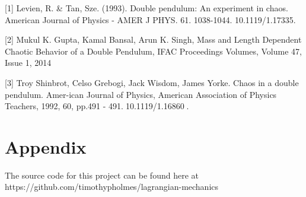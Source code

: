 \documentclass[runningheads]{llncs}
\begin{document}
\clearpage{}



\clearpage{}
%
%
%





[1] Levien, R. & Tan, Sze. (1993). Double pendulum: An experiment in chaos. American Journal of Physics - AMER J PHYS. 61. 1038-1044. 10.1119/1.17335. 

[2] Mukul K. Gupta, Kamal Bansal, Arun K. Singh,
Mass and Length Dependent Chaotic Behavior of a Double Pendulum,
IFAC Proceedings Volumes, Volume 47, Issue 1, 2014

[3] Troy Shinbrot, Celso Grebogi, Jack Wisdom, James Yorke.  Chaos in a double pendulum.  Amer-ican  Journal  of  Physics,  American  Association  of  Physics  Teachers,  1992,  60,  pp.491  -  491.￿10.1119/1.16860￿.




\section*{Appendix}

The source code for this project can be found here at \\
https://github.com/timothypholmes/lagrangian-mechanics
\end{document}
